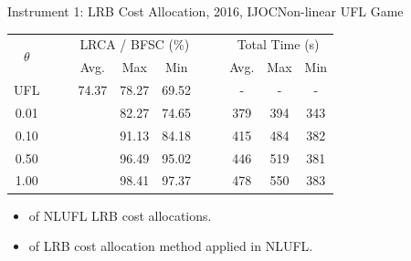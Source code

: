 \documentclass[14pt]{beamer}
\begin{document}
\begin{frame}{Instrument 1: LRB Cost Allocation, {\footnotesize 2016, IJOC}}{Non-linear UFL Game}
\footnotesize

\begin{table}[H]
\centering
\tabcolsep=7pt
\footnotesize
\renewcommand\arraystretch{1.3}
\setlength{\abovecaptionskip}{100pt}
\setlength{\belowcaptionskip}{100pt}
\begin{tabular}[!h]{c c c c c c c c c c c}
\hline
\multirow{2}{*}{$\theta$} &\multicolumn{2}{c}{} & \multicolumn{3}{c}{LRCA / BFSC (\%)} &\multicolumn{2}{c}{} & \multicolumn{3}{c}{Total Time (s)}\\
\cline{4-6}
\cline{9-11}
&& &Avg. & Max &Min	&& &Avg.	&Max	&Min\\
\hline
UFL  &&  &74.37	&78.27	&69.52	&&	&-	&-	&-\\

0.01  &&  &{\color{teal}{\bf 78.31}}	&82.27	&74.65	&&	&379	&394	&343\\

0.10  &&  &{\color{teal}{\bf 87.75}}	&91.13	&84.18	&&	&415	&484	&382\\

0.50  &&  &{\color{teal}{\bf 95.83}}	&96.49	&95.02	&&	&446	&519	&381\\

1.00  &&  &{\color{teal}{\bf 97.82}}	&98.41	&97.37	&&	&478	&550	&383\\
\hline
\end{tabular}
\end{table}
\vspace{-1.2em}
\begin{shaded}
\begin{itemize}
\item {\color{red}{Effectiveness}} of NLUFL LRB cost allocations.
\item {\color{red}{Time efficiency}} of LRB cost allocation method applied in NLUFL.
\end{itemize}
\end{shaded}
\end{frame}
\end{document}
